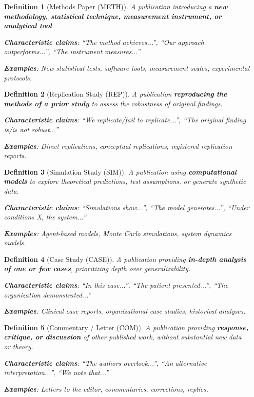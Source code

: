\documentclass[11pt,a4paper]{article}
\newtheorem{definition}{Definition}[section]
\begin{document}
\begin{definition}[Methods Paper (METH)]
\label{def:meth}
A publication introducing a \textbf{new methodology, statistical technique, measurement instrument, or analytical tool}.

\textbf{Characteristic claims}: ``The method achieves...'', ``Our approach outperforms...'', ``The instrument measures...''

\textbf{Examples}: New statistical tests, software tools, measurement scales, experimental protocols.
\end{definition}

\begin{definition}[Replication Study (REP)]
\label{def:rep}
A publication \textbf{reproducing the methods of a prior study} to assess the robustness of original findings.

\textbf{Characteristic claims}: ``We replicate/fail to replicate...'', ``The original finding is/is not robust...''

\textbf{Examples}: Direct replications, conceptual replications, registered replication reports.
\end{definition}

\begin{definition}[Simulation Study (SIM)]
\label{def:sim}
A publication using \textbf{computational models} to explore theoretical predictions, test assumptions, or generate synthetic data.

\textbf{Characteristic claims}: ``Simulations show...'', ``The model generates...'', ``Under conditions X, the system...''

\textbf{Examples}: Agent-based models, Monte Carlo simulations, system dynamics models.
\end{definition}

\begin{definition}[Case Study (CASE)]
\label{def:case}
A publication providing \textbf{in-depth analysis of one or few cases}, prioritizing depth over generalizability.

\textbf{Characteristic claims}: ``In this case...'', ``The patient presented...'', ``The organization demonstrated...''

\textbf{Examples}: Clinical case reports, organizational case studies, historical analyses.
\end{definition}

\begin{definition}[Commentary / Letter (COM)]
\label{def:com}
A publication providing \textbf{response, critique, or discussion} of other published work, without substantial new data or theory.

\textbf{Characteristic claims}: ``The authors overlook...'', ``An alternative interpretation...'', ``We note that...''

\textbf{Examples}: Letters to the editor, commentaries, corrections, replies.
\end{definition}
\end{document}
